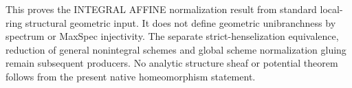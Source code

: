 \begin{remark}
This proves the INTEGRAL AFFINE normalization result from standard
local-ring structural geometric input. It does not define geometric
unibranchness by spectrum or MaxSpec injectivity. The separate
strict-henselization equivalence, reduction of general nonintegral
schemes and global scheme normalization gluing remain subsequent
producers. No analytic structure sheaf or potential theorem follows
from the present native homeomorphism statement.
\end{remark}
